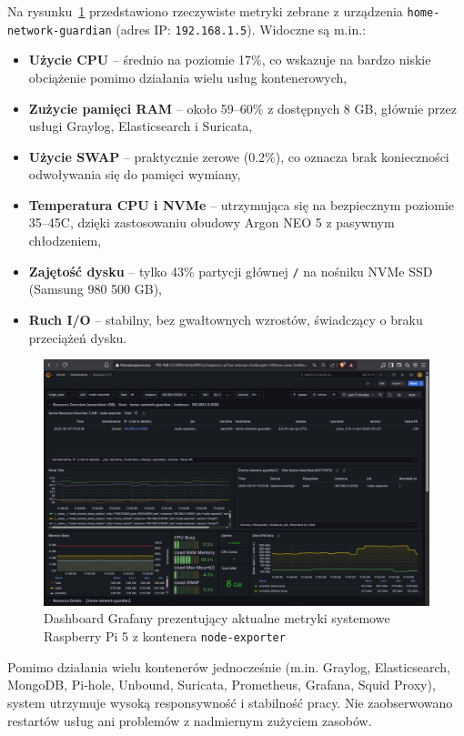 \documentclass[
    left=2.5cm,         %
    right=2.5cm,        %
    top=2.5cm,          %
    bottom=3cm,         %
    bindingoffset=6mm,  %
    nohyphenation=true %
]{eiti/eiti-thesis} %
\begin{document}
Na rysunku~\ref{fig:grafana} przedstawiono rzeczywiste metryki zebrane z urządzenia \texttt{home-network-guardian} (adres IP: \texttt{192.168.1.5}). Widoczne są m.in.:
\begin{itemize}
    \item \textbf{Użycie CPU} – średnio na poziomie 17\%, co wskazuje na bardzo niskie obciążenie pomimo działania wielu usług kontenerowych,
    \item \textbf{Zużycie pamięci RAM} – około 59–60\% z dostępnych 8 GB, głównie przez usługi Graylog, Elasticsearch i Suricata,
    \item \textbf{Użycie SWAP} – praktycznie zerowe (0.2\%), co oznacza brak konieczności odwoływania się do pamięci wymiany,
    \item \textbf{Temperatura CPU i NVMe} – utrzymująca się na bezpiecznym poziomie 35–45\textdegree C, dzięki zastosowaniu obudowy Argon NEO 5 z pasywnym chłodzeniem,
    \item \textbf{Zajętość dysku} – tylko 43\% partycji głównej \texttt{/} na nośniku NVMe SSD (Samsung 980 500 GB),
    \item \textbf{Ruch I/O} – stabilny, bez gwałtownych wzrostów, świadczący o braku przeciążeń dysku.
\end{itemize}

\begin{figure}[H]
    \centering
    \includegraphics[width=\textwidth]{grafana.png}
    \caption{Dashboard Grafany prezentujący aktualne metryki systemowe Raspberry Pi 5 z kontenera \texttt{node-exporter}}
    \label{fig:grafana}
\end{figure}

Pomimo działania wielu kontenerów jednocześnie (m.in. Graylog, Elasticsearch, MongoDB, Pi-hole, Unbound, Suricata, Prometheus, Grafana, Squid Proxy), system utrzymuje wysoką responsywność i stabilność pracy. Nie zaobserwowano restartów usług ani problemów z nadmiernym zużyciem zasobów.
\end{document}
